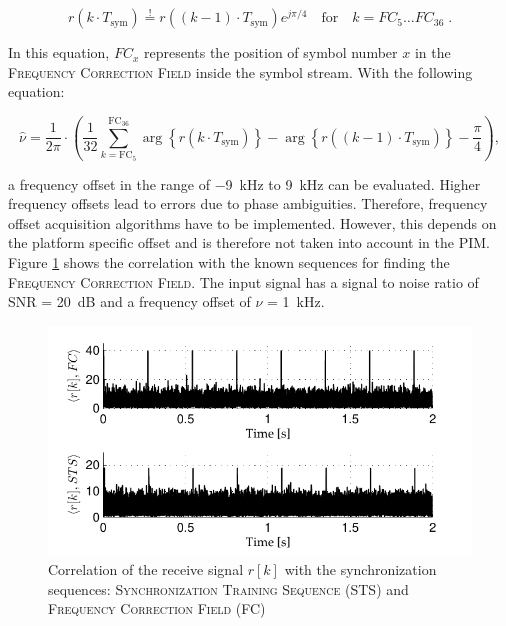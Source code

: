\begin{equation}
r(k \cdot T_\text{sym}) \stackrel{!}{=} r((k-1)\cdot T_\text{sym}) e^{j\pi/4} \quad \text{for} \quad k=FC_5 \dots FC_{36}\;.
\end{equation}

In this equation, $FC_x$ represents the position of symbol number $x$ in the \textsc{Frequency Correction Field} inside the symbol stream. With the following equation:

\begin{equation}
\hat{\nu} = \frac{1}{2\pi} \cdot \left( \frac{1}{32}\sum_{k=\text{FC}_5}^{\text{FC}_{36}}\arg \left\{r(k \cdot T_\text{sym})\right\} - \arg \left\{r((k-1)\cdot T_\text{sym})\right\} -  \frac{\pi}{4} \right),
\end{equation}

a frequency offset in the range of \SI{-9}{kHz} to \SI{9}{kHz} can be evaluated. Higher frequency offsets lead to errors due to phase ambiguities. Therefore, frequency offset acquisition algorithms have to be implemented. However, this depends on the platform specific offset and is therefore not taken into account in the \ac{PIM}. Figure \ref{fig:freq_peak} shows the correlation with the known sequences for finding the \textsc{Frequency Correction Field}. The input signal has a signal to noise ratio of SNR = \SI{20}{dB} and a frequency offset of $\nu$ = \SI{1}{kHz}.


\begin{figure}[htb]
	\centering
		\includegraphics[width=1.00\textwidth]{../kapitel04/figures/freq_peak.pdf}
	\caption{Correlation of the receive signal $r[k]$ with the synchronization sequences: \textsc{Synchronization Training Sequence} (STS) and \textsc{Frequency Correction Field} (FC)}
	\label{fig:freq_peak}
\end{figure}

